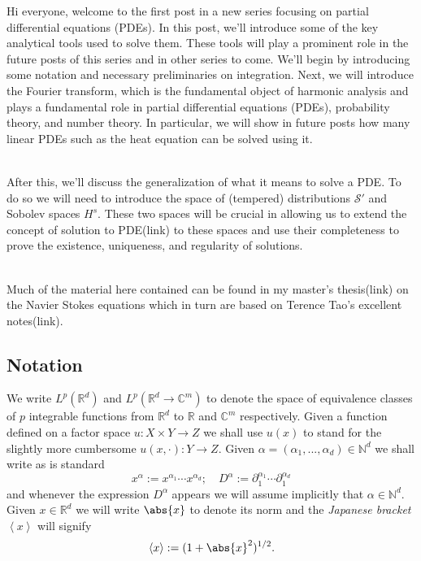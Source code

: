 \documentclass[
]{article}
\begin{document}
Hi everyone, welcome to the first post in a new series focusing on
partial differential equations (PDEs). In this post, we'll introduce
some of the key analytical tools used to solve them. These tools will
play a prominent role in the future posts of this series and in other
series to come. We'll begin by introducing some notation and necessary
preliminaries on integration. Next, we will introduce the Fourier
transform, which is the fundamental object of harmonic analysis and
plays a fundamental role in partial differential equations (PDEs),
probability theory, and number theory. In particular, we will show in
future posts how many linear PDEs such as the heat equation can be
solved using it.\\
\strut \\
After this, we'll discuss the generalization of what it means to solve a
PDE. To do so we will need to introduce the space of (tempered)
distributions \({\mathcal S}'\) and Sobolev spaces \(H^s\). These two
spaces will be crucial in allowing us to extend the concept of solution
to PDE(link) to these spaces and use their completeness to prove the
existence, uniqueness, and regularity of solutions.\\
\strut \\
Much of the material here contained can be found in my master's
thesis(link) on the Navier Stokes equations which in turn are based on
Terence Tao's excellent notes(link).

\hypertarget{notation}{%
	\subsection*{Notation}\label{notation}}

We write \(L^p({\mathbb R}^d)\) and
\(L^p({\mathbb R}^d\to\mathbb{C}^m)\) to denote the space of equivalence
classes of \(p\) integrable functions from \({\mathbb R}^d\) to
\({\mathbb R}\) and \(\mathbb{C}^m\) respectively. Given a function
defined on a factor space \(u:X\times Y\rightarrow Z\) we shall use
\(u(x)\) to stand for the slightly more cumbersome
\(u(x,\cdot ):Y\rightarrow Z\). Given
\(\alpha=(\alpha_1,...,\alpha_d)\in\mathbb{N}^d\) we shall write as is
standard
\[x^\alpha:=x^{\alpha_1}\cdots  x^{\alpha_d};\quad D^\alpha:=\partial_1^{\alpha_1}\cdots\partial_1^{\alpha_d}\]
and whenever the expression \(D^\alpha\) appears we will assume
implicitly that \(\alpha\in\mathbb{N}^d\). Given \(x\in{\mathbb R}^d\)
we will write \(\abs{x}\) to denote its norm and the \emph{Japanese
	bracket} \(\left\langle x\right\rangle\) will signify
\[\left\langle x\right\rangle:=(1+\abs{x}^2)^{1/2}.\]
\end{document}
